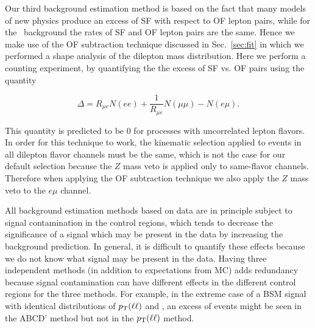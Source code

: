 Our third background estimation method is based on the fact that many models of new physics
produce an excess of SF with respect to OF lepton pairs, while for the \ttbar\ background the
rates of SF and OF lepton pairs are the same. Hence we make use of the OF subtraction technique
discussed in Sec.~\ref{sec:fit} in which we performed a shape analysis of the dilepton mass distribution.
Here we perform a counting experiment, by quantifying the  the excess of SF vs. OF pairs using the
quantity

\begin{equation}
\label{eq:ofhighpt}
\Delta = R_{\mu e}N(ee) + \frac{1}{R_{\mu e}}N(\mu\mu) - N(e\mu).
\end{equation}

This quantity is predicted to be 0 for processes with 
uncorrelated lepton flavors. In order for this technique to work, the kinematic selection 
applied to events in all dilepton flavor channels must be the same, which is not the case 
for our default selection because the $Z$ mass veto is applied only to same-flavor channels.
Therefore when applying the OF subtraction technique we also apply the $Z$ mass veto
to the $e\mu$ channel. 

All background estimation methods based on data are in principle subject to signal contamination
in the control regions, which tends to decrease the significance of a signal
which may be present in the data by increasing the background prediction.
In general, it is difficult to quantify these effects because we 
do not know what signal may be present in the data.  Having three
independent methods (in addition to expectations from MC)
adds redundancy because signal contamination can have different effects
in the different control regions for the three methods.
For example, in the extreme case of a
BSM signal with identical distributions of $p_{\mathrm{T}}(\ell \ell)$ and \MET, an excess of events might be seen 
in the ABCD' method but not in the $p_{\mathrm{T}}(\ell \ell)$ method.

